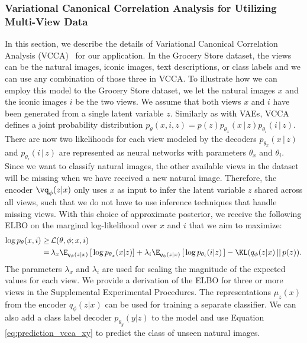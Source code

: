 \subsubsection{Variational Canonical Correlation Analysis for Utilizing Multi-View Data}
\label{sec:utilizing_additional_information}

In this section, we describe the details of Variational Canonical Correlation Analysis (VCCA)~\cite{wang2016deep} for our application. In the Grocery Store dataset, the views can be the natural images, iconic images, text descriptions, or class labels and we can use any combination of those three in VCCA. To illustrate how we can employ this model to the Grocery Store dataset, we let the natural images $x$ and the iconic images $i$ be the two views.  
We assume that both views $x$ and $i$ have been generated from a single latent variable $z$. Similarly as with VAEs, VCCA defines a joint probability distribution $p_{\theta}(x, i, z) = p(z)p_{\theta_{x}}(x\,|\,z)p_{\theta_{i}}(i\,|\,z)$. There are now two likelihoods for each view modeled by the decoders $p_{\theta_{x}}(x\,|\,z)$ and $p_{\theta_{i}}(i\,|\,z)$ are represented as neural networks with parameters $\theta_{x}$ and $\theta_{i}$. 
Since we want to classify natural images, the other available views in the dataset will be missing when we have received a new natural image. Therefore, the encoder $\vq_{\phi}(z | x)$ only uses $x$ as input to infer the latent variable $z$ shared across all views, such that we do not have to use inference techniques that handle missing views. With this choice of approximate posterior, we receive the following ELBO on the marginal log-likelihood over $x$ and $i$ that we aim to maximize:
\begin{align}\label{eq:loss_vcca}
    \begin{split}
        \log p_{\theta}(x, i) \geq & \, \mathcal{L}(\theta, \phi; x, i) \\ 
        = & \,  \lambda_{x} \E_{q_{\phi}(z|x)}\left[\, \log p_{\theta_{x}}(x | z) \right] + \lambda_{i} \E_{q_{\phi}(z|x)}\left[\, \log p_{\theta_{i}}(i | z) \,\right] - \KL(q_{\phi}(z|x)\,||\,p(z)) .
    \end{split}
\end{align}  
The parameters $\lambda_{x}$ and $\lambda_{i}$ are used for scaling the magnitude of the expected values for each view. 
We provide a derivation of the ELBO for three or more views in the Supplemental Experimental Procedures.
The representations $\mu_{z}(x)$ from the encoder $q_{\phi}(z|x)$ can be used for training a separate classifier. We can also add a class label decoder $p_{\theta_{y}}(y | z)$ to the model and use Equation \ref{eq:prediction_vcca_xy} to predict the class of unseen natural images.


